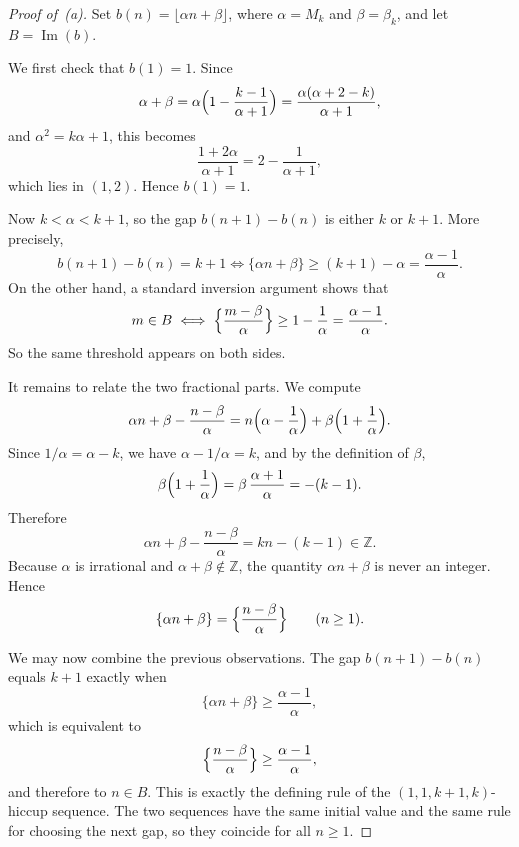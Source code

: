 \documentclass[10pt,a4paper]{amsart}
\newcommand{\Z}{\mathbb{Z}}
\begin{document}
\begin{proof}[Proof of~\textup{(a)}]
Set $b(n)=\lfloor \alpha n+\beta\rfloor$, where $\alpha=M_k$ and
$\beta=\beta_k$, and let $B=\operatorname{Im}(b)$.

We first check that $b(1)=1$.  Since
\[
\alpha+\beta
=\alpha\Bigl(1-\frac{k-1}{\alpha+1}\Bigr)
=\frac{\alpha(\alpha+2-k)}{\alpha+1},
\]
and $\alpha^2=k\alpha+1$, this becomes
\[
\frac{1+2\alpha}{\alpha+1}
=2-\frac{1}{\alpha+1},
\]
which lies in $(1,2)$.  Hence $b(1)=1$.

Now $k<\alpha<k+1$, so the gap $b(n+1)-b(n)$ is either $k$ or $k+1$.
More precisely,
\[
b(n+1)-b(n)=k+1
\iff \{\alpha n+\beta\}\ge (k+1)-\alpha
=\frac{\alpha-1}{\alpha}.
\]
On the other hand, a standard inversion argument shows that
\[
m\in B
\iff \Bigl\{\frac{m-\beta}{\alpha}\Bigr\}\ge 1-\frac1\alpha
=\frac{\alpha-1}{\alpha}.
\]
So the same threshold appears on both sides.

It remains to relate the two fractional parts.  We compute
\[
\alpha n+\beta-\frac{n-\beta}{\alpha}
=n\Bigl(\alpha-\frac1\alpha\Bigr)
+\beta\Bigl(1+\frac1\alpha\Bigr).
\]
Since $1/\alpha=\alpha-k$, we have $\alpha-1/\alpha=k$, and by the
definition of $\beta$,
\[
\beta\Bigl(1+\frac1\alpha\Bigr)
=\beta\,\frac{\alpha+1}{\alpha}
=-(k-1).
\]
Therefore
\[
\alpha n+\beta-\frac{n-\beta}{\alpha}=kn-(k-1)\in\Z.
\]
Because $\alpha$ is irrational and $\alpha+\beta\notin\Z$, the quantity
$\alpha n+\beta$ is never an integer.  Hence
\[
\{\alpha n+\beta\}
=
\Bigl\{\frac{n-\beta}{\alpha}\Bigr\}
\qquad (n\ge1).
\]

We may now combine the previous observations.  The gap $b(n+1)-b(n)$
equals $k+1$ exactly when
\[
\{\alpha n+\beta\}\ge \frac{\alpha-1}{\alpha},
\]
which is equivalent to
\[
\Bigl\{\frac{n-\beta}{\alpha}\Bigr\}\ge \frac{\alpha-1}{\alpha},
\]
and therefore to $n\in B$.  This is exactly the defining rule of the
$(1,1,k{+}1,k)$-hiccup sequence.  The two sequences have the same
initial value and the same rule for choosing the next gap, so they
coincide for all $n\ge1$.
\end{proof}
\end{document}
